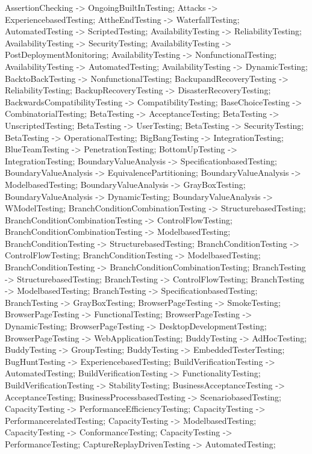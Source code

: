 \documentclass{article}
\begin{document}
{AssertionChecking -> OngoingBuiltInTesting;
Attacks -> ExperiencebasedTesting;
AttheEndTesting -> WaterfallTesting;
AutomatedTesting -> ScriptedTesting;
AvailabilityTesting -> ReliabilityTesting;
AvailabilityTesting -> SecurityTesting;
AvailabilityTesting -> PostDeploymentMonitoring;
AvailabilityTesting -> NonfunctionalTesting;
AvailabilityTesting -> AutomatedTesting;
AvailabilityTesting -> DynamicTesting;
BacktoBackTesting -> NonfunctionalTesting;
BackupandRecoveryTesting -> ReliabilityTesting;
BackupRecoveryTesting -> DisasterRecoveryTesting;
BackwardsCompatibilityTesting -> CompatibilityTesting;
BaseChoiceTesting -> CombinatorialTesting;
BetaTesting -> AcceptanceTesting;
BetaTesting -> UnscriptedTesting;
BetaTesting -> UserTesting;
BetaTesting -> SecurityTesting;
BetaTesting -> OperationalTesting;
BigBangTesting -> IntegrationTesting;
BlueTeamTesting -> PenetrationTesting;
BottomUpTesting -> IntegrationTesting;
BoundaryValueAnalysis -> SpecificationbasedTesting;
BoundaryValueAnalysis -> EquivalencePartitioning;
BoundaryValueAnalysis -> ModelbasedTesting;
BoundaryValueAnalysis -> GrayBoxTesting;
BoundaryValueAnalysis -> DynamicTesting;
BoundaryValueAnalysis -> WModelTesting;
BranchConditionCombinationTesting -> StructurebasedTesting;
BranchConditionCombinationTesting -> ControlFlowTesting;
BranchConditionCombinationTesting -> ModelbasedTesting;
BranchConditionTesting -> StructurebasedTesting;
BranchConditionTesting -> ControlFlowTesting;
BranchConditionTesting -> ModelbasedTesting;
BranchConditionTesting -> BranchConditionCombinationTesting;
BranchTesting -> StructurebasedTesting;
BranchTesting -> ControlFlowTesting;
BranchTesting -> ModelbasedTesting;
BranchTesting -> SpecificationbasedTesting;
BranchTesting -> GrayBoxTesting;
BrowserPageTesting -> SmokeTesting;
BrowserPageTesting -> FunctionalTesting;
BrowserPageTesting -> DynamicTesting;
BrowserPageTesting -> DesktopDevelopmentTesting;
BrowserPageTesting -> WebApplicationTesting;
BuddyTesting -> AdHocTesting;
BuddyTesting -> GroupTesting;
BuddyTesting -> EmbeddedTesterTesting;
BugHuntTesting -> ExperiencebasedTesting;
BuildVerificationTesting -> AutomatedTesting;
BuildVerificationTesting -> FunctionalityTesting;
BuildVerificationTesting -> StabilityTesting;
BusinessAcceptanceTesting -> AcceptanceTesting;
BusinessProcessbasedTesting -> ScenariobasedTesting;
CapacityTesting -> PerformanceEfficiencyTesting;
CapacityTesting -> PerformancerelatedTesting;
CapacityTesting -> ModelbasedTesting;
CapacityTesting -> ConformanceTesting;
CapacityTesting -> PerformanceTesting;
CaptureReplayDrivenTesting -> AutomatedTesting;
}
\end{document}
